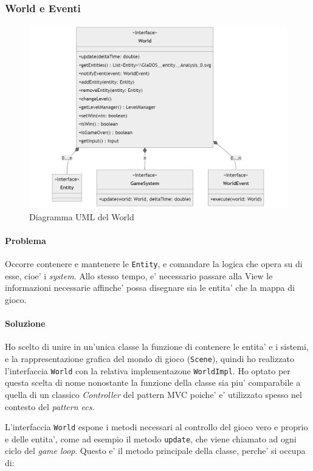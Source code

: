 \documentclass[a4paper,12pt]{report}
\begin{document}
\subsubsection{World e Eventi}

\begin{figure}[h]
	\centering
	\includegraphics[width=\textwidth]{uml/uml_world.png}
	\caption{Diagramma UML del World}
	\label{img:badarch}
\end{figure}

\paragraph*{Problema}
Occorre contenere e mantenere le \texttt{Entity}, e comandare la logica che opera su di esse, cioe' i \textit{system}. Allo stesso tempo, e' necessario passare alla View le informazioni necessarie affinche' possa disegnare sia le entita' che la mappa di gioco. 

\paragraph*{Soluzione}
Ho scelto di unire in un'unica classe la funzione di contenere le entita' e i sistemi, e la rappresentazione grafica del mondo di gioco (\texttt{Scene}), quindi ho realizzato l'interfaccia \texttt{World} con la relativa implementazone \texttt{WorldImpl}. Ho optato per questa scelta di nome nonostante la funzione della classe sia piu' comparabile a quella di un classico \textit{Controller} del pattern MVC poiche' e' utilizzato spesso nel contesto del \textit{pattern ecs}.

L'interfaccia \texttt{World} espone i metodi necessari al controllo del gioco vero e proprio e delle entita', come ad esempio il metodo \texttt{update}, che viene chiamato ad ogni ciclo del \textit{game loop}. Questo e' il metodo principale della classe, perche' si occupa di:
\end{document}
